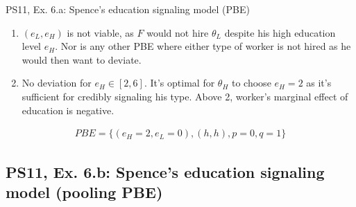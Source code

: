 \begin{frame}{PS11, Ex. 6.a: Spence’s education signaling model (PBE)}
\begin{multicols}{2}
      \begin{enumerate}
        \item $(e_L,e_H)$ is not viable, as $F$ would not hire $\theta_L$ despite his high education level $e_H$. Nor is any other PBE where either type of worker is not hired as he would then want to deviate.
        \item No deviation for $e_H\in[2,6]$. It's optimal for $\theta_H$ to choose $e_H=2$ as it's sufficient for credibly signaling his type. Above 2, worker's marginal effect of education is negative.
      \end{enumerate}\vspace{-14pt}
      \begin{align*}
        PBE=\{(e_H=2,e_L=0),(h,h),p=0,q=1\}
      \end{align*}
      \vfill\null
    \end{multicols}
\end{frame}


\subsection{PS11, Ex. 6.b: Spence’s education signaling model (pooling PBE)}

